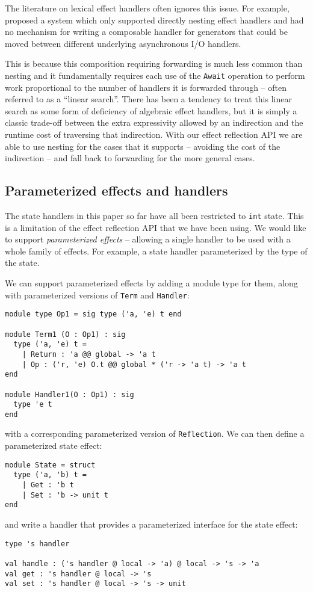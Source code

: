 \documentclass[acmsmall, screen, nonacm]{acmart}
\theoremstyle{definition}
\begin{document}
The literature on lexical effect handlers often ignores this issue. For
example, \cite{??} proposed a system which only supported directly
nesting effect handlers and had no mechanism for writing a composable
handler for generators that could be moved between different underlying
asynchronous I/O handlers.

This is because this composition requiring forwarding is much less
common than nesting and it fundamentally requires each use of the
\lstinline[style=ocaml]{Await} operation to perform work proportional to
the number of handlers it is forwarded through -- often referred to as a
``linear search''. There has been a tendency to treat this linear search
as some form of deficiency of algebraic effect handlers, but it is
simply a classic trade-off between the extra expressivity allowed by an
indirection and the runtime cost of traversing that indirection. With
our effect reflection API we are able to use nesting for the cases that
it supports -- avoiding the cost of the indirection -- and fall back to
forwarding for the more general cases.

\subsection{Parameterized effects and handlers}

The state handlers in this paper so far have all been restricted to
\lstinline[style=ocaml]{int} state. This is a limitation of the effect
reflection API that we have been using. We would like to support
\emph{parameterized effects} -- allowing a single handler to be used
with a whole family of effects. For example, a state handler
parameterized by the type of the state.

We can support parameterized effects by adding a module type for them,
along with parameterized versions of \lstinline[style=ocaml]{Term} and
\lstinline[style=ocaml]{Handler}:
\begin{lstlisting}[style=ocaml]
module type Op1 = sig type ('a, 'e) t end

module Term1 (O : Op1) : sig
  type ('a, 'e) t =
    | Return : 'a @@ global -> 'a t
    | Op : ('r, 'e) O.t @@ global * ('r -> 'a t) -> 'a t
end

module Handler1(O : Op1) : sig
  type 'e t
end
\end{lstlisting}
with a corresponding parameterized version of
\lstinline[style=ocaml]{Reflection}. We can then define a parameterized
state effect:
\begin{lstlisting}[style=ocaml]
module State = struct
  type ('a, 'b) t =
    | Get : 'b t
    | Set : 'b -> unit t
end
\end{lstlisting}
and write a handler that provides a parameterized interface for the
state effect:
\begin{lstlisting}[style=ocaml]
type 's handler

val handle : ('s handler @ local -> 'a) @ local -> 's -> 'a
val get : 's handler @ local -> 's
val set : 's handler @ local -> 's -> unit
\end{lstlisting}
\end{document}
